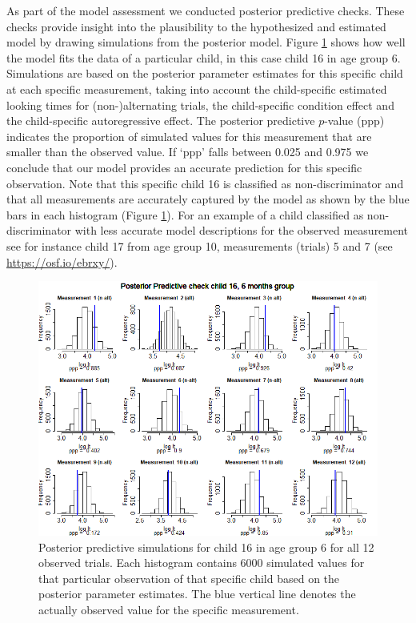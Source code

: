 \documentclass[openright,titlepage,12pt,a4paper]{book}
\begin{document}
As part of the model assessment we conducted posterior predictive checks. These checks provide insight into the plausibility to the hypothesized and estimated model by drawing simulations from the posterior model. Figure \ref{fig:ch04fig7} shows how well the model fits the data of a particular child, in this case child 16 in age group 6. Simulations are based on the posterior parameter estimates for this specific child at each specific measurement, taking into account the child-specific estimated looking times for (non-)alternating trials, the child-specific condition effect and the child-specific autoregressive effect. The posterior predictive \(p\)-value (ppp) indicates the proportion of simulated values for this measurement that are smaller than the observed value. If `ppp' falls between 0.025 and 0.975 we conclude that our model provides an accurate prediction for this specific observation. Note that this specific child 16 is classified as non-discriminator and that all measurements are accurately captured by the model as shown by the blue bars in each histogram (Figure \ref{fig:ch04fig7}). For an example of a child classified as non-discriminator with less accurate model descriptions for the observed measurement see for instance child 17 from age group 10, measurements (trials) 5 and 7 (see \url{https://osf.io/ebrxy/}).

\begin{figure}

{\centering \includegraphics[width=0.9\linewidth]{figures/chapter_4/Figure7} 

}

\caption{Posterior predictive simulations for child 16 in age group 6 for all 12 observed trials. Each histogram contains 6000 simulated values for that particular observation of that specific child based on the posterior parameter estimates. The blue vertical line denotes the actually observed value for the specific measurement.}\label{fig:ch04fig7}
\end{figure}
\end{document}
